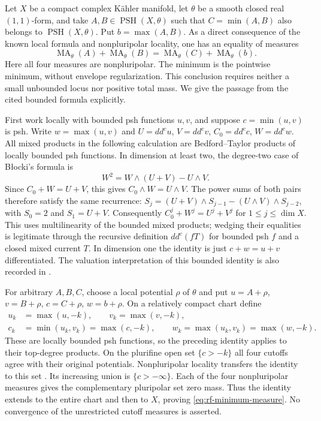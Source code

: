 Let $X$ be a compact complex K\"ahler manifold, let $\theta$ be
a smooth closed real $(1,1)$-form, and take
$A,B\in\operatorname{PSH}(X,\theta)$ such that
$C=\min(A,B)$ also belongs to $\operatorname{PSH}(X,\theta)$.
Put $b=\max(A,B)$. As a direct consequence of the known local
formula and nonpluripolar locality, one has an equality of measures
\[
\tag{65.54}\label{eq:rf-minimum-measure}
 \operatorname{MA}_\theta(A)+\operatorname{MA}_\theta(B)
 =\operatorname{MA}_\theta(C)+\operatorname{MA}_\theta(b).
\]
Here all four measures are nonpluripolar. The minimum is the
pointwise minimum, without envelope regularization. This conclusion
requires neither a small unbounded locus nor positive total mass.
We give the passage from the cited bounded formula explicitly.

First work locally with bounded psh functions $u,v$, and suppose
$c=\min(u,v)$ is psh. Write $w=\max(u,v)$ and
$U=dd^cu$, $V=dd^cv$, $C_0=dd^cc$, $W=dd^cw$.
All mixed products in the following calculation are Bedford--Taylor
products of locally bounded psh functions. In dimension at least two,
the degree-two case of B\l ocki's formula is
\[
\tag{65.55}\label{eq:rf-blocki-degree-two}
 W^2=W\wedge(U+V)-U\wedge V.
\]
Since $C_0+W=U+V$, this gives $C_0\wedge W=U\wedge V$.
The power sums of both pairs therefore satisfy the same recurrence:
$S_j=(U+V)\wedge S_{j-1}-(U\wedge V)\wedge S_{j-2}$,
with $S_0=2$ and $S_1=U+V$.
Consequently $C_0^j+W^j=U^j+V^j$ for $1\leq j\leq\dim X$.
This uses multilinearity of the bounded mixed products; wedging
their equalities is legitimate through the recursive definition
$dd^c(fT)$ for bounded psh $f$ and a closed mixed current $T$.
In dimension one the identity is just $c+w=u+v$ differentiated.
The valuation interpretation of this bounded identity is also
recorded in \cite[Section~3.1]{Alesker17Valuations}.

For arbitrary $A,B,C$, choose a local potential $\rho$ of $\theta$
and put $u=A+\rho$, $v=B+\rho$, $c=C+\rho$, $w=b+\rho$.
On a relatively compact chart define
\[
\tag{65.56}\label{eq:rf-minimum-local-cutoffs}
 \begin{split}
 u_k&=\max(u,-k),\qquad v_k=\max(v,-k),\\
 c_k&=\min(u_k,v_k)=\max(c,-k),\qquad
 w_k=\max(u_k,v_k)=\max(w,-k).
 \end{split}
\]
These are locally bounded psh functions, so the preceding identity
applies to their top-degree products. On the plurifine open set
$\{c>-k\}$ all four cutoffs agree with their original potentials.
Nonpluripolar locality transfers the identity to this set
\cite{BEGZ10}. Its increasing union is $\{c>-\infty\}$.
Each of the four nonpluripolar measures gives the complementary
pluripolar set zero mass. Thus the identity extends to the entire
chart and then to $X$, proving \eqref{eq:rf-minimum-measure}.
No convergence of the unrestricted cutoff measures is asserted.

